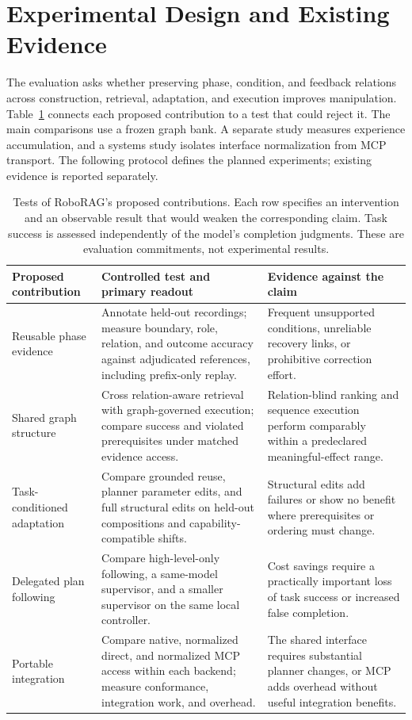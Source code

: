 \section{Experimental Design and Existing Evidence}
\label{sec:experiments}

The evaluation asks whether preserving phase, condition, and feedback relations across construction, retrieval, adaptation, and execution improves manipulation. Table~\ref{tab:claim-tests} connects each proposed contribution to a test that could reject it. The main comparisons use a frozen graph bank. A separate study measures experience accumulation, and a systems study isolates interface normalization from MCP transport. The following protocol defines the planned experiments; existing evidence is reported separately.

\begin{table}[t]
\centering
\small
\caption{Tests of RoboRAG's proposed contributions. Each row specifies an intervention and an observable result that would weaken the corresponding claim. Task success is assessed independently of the model's completion judgments. These are evaluation commitments, not experimental results.}
\label{tab:claim-tests}
\begin{tabularx}{\textwidth}{@{}p{}XX@{}}
\toprule
Proposed contribution & Controlled test and primary readout & Evidence against the claim \\
\midrule
Reusable phase evidence & Annotate held-out recordings; measure boundary, role, relation, and outcome accuracy against adjudicated references, including prefix-only replay. & Frequent unsupported conditions, unreliable recovery links, or prohibitive correction effort. \\
Shared graph structure & Cross relation-aware retrieval with graph-governed execution; compare success and violated prerequisites under matched evidence access. & Relation-blind ranking and sequence execution perform comparably within a predeclared meaningful-effect range. \\
Task-conditioned adaptation & Compare grounded reuse, planner parameter edits, and full structural edits on held-out compositions and capability-compatible shifts. & Structural edits add failures or show no benefit where prerequisites or ordering must change. \\
Delegated plan following & Compare high-level-only following, a same-model supervisor, and a smaller supervisor on the same local controller. & Cost savings require a practically important loss of task success or increased false completion. \\
Portable integration & Compare native, normalized direct, and normalized MCP access within each backend; measure conformance, integration work, and overhead. & The shared interface requires substantial planner changes, or MCP adds overhead without useful integration benefits. \\
\bottomrule
\end{tabularx}
\end{table}

